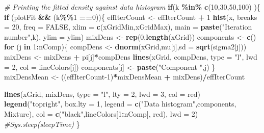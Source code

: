 \documentclass[]{article}
\newenvironment{Shaded}{\begin{snugshade}}{\end{snugshade}}
\newcommand{\CommentTok}[1]{\textcolor[rgb]{0.56,0.35,0.01}{\textit{#1}}}
\newcommand{\ControlFlowTok}[1]{\textcolor[rgb]{0.13,0.29,0.53}{\textbf{#1}}}
\newcommand{\DataTypeTok}[1]{\textcolor[rgb]{0.13,0.29,0.53}{#1}}
\newcommand{\DecValTok}[1]{\textcolor[rgb]{0.00,0.00,0.81}{#1}}
\newcommand{\KeywordTok}[1]{\textcolor[rgb]{0.13,0.29,0.53}{\textbf{#1}}}
\newcommand{\NormalTok}[1]{#1}
\newcommand{\OperatorTok}[1]{\textcolor[rgb]{0.81,0.36,0.00}{\textbf{#1}}}
\newcommand{\OtherTok}[1]{\textcolor[rgb]{0.56,0.35,0.01}{#1}}
\newcommand{\StringTok}[1]{\textcolor[rgb]{0.31,0.60,0.02}{#1}}
\begin{document}
\begin{Shaded}
\begin{Highlighting}[]
  
  \CommentTok{\# Printing the fitted density against data histogram}
  \ControlFlowTok{if}\NormalTok{(k }\OperatorTok{\%in\%}\StringTok{ }\KeywordTok{c}\NormalTok{(}\DecValTok{10}\NormalTok{,}\DecValTok{30}\NormalTok{,}\DecValTok{50}\NormalTok{,}\DecValTok{100}\NormalTok{) )\{}
  \ControlFlowTok{if}\NormalTok{ (plotFit }\OperatorTok{\&\&}\StringTok{ }\NormalTok{(k}\OperatorTok{\%\%}\DecValTok{1} \OperatorTok{==}\DecValTok{0}\NormalTok{))\{}
\NormalTok{    effIterCount \textless{}{-}}\StringTok{ }\NormalTok{effIterCount }\OperatorTok{+}\StringTok{ }\DecValTok{1}
    \KeywordTok{hist}\NormalTok{(x, }\DataTypeTok{breaks =} \DecValTok{20}\NormalTok{, }\DataTypeTok{freq =} \OtherTok{FALSE}\NormalTok{, }\DataTypeTok{xlim =} \KeywordTok{c}\NormalTok{(xGridMin,xGridMax), }\DataTypeTok{main =} \KeywordTok{paste}\NormalTok{(}\StringTok{"Iteration number"}\NormalTok{,k), }\DataTypeTok{ylim =}\NormalTok{ ylim)}
\NormalTok{    mixDens \textless{}{-}}\StringTok{ }\KeywordTok{rep}\NormalTok{(}\DecValTok{0}\NormalTok{,}\KeywordTok{length}\NormalTok{(xGrid))}
\NormalTok{    components \textless{}{-}}\StringTok{ }\KeywordTok{c}\NormalTok{()}
    \ControlFlowTok{for}\NormalTok{ (j }\ControlFlowTok{in} \DecValTok{1}\OperatorTok{:}\NormalTok{nComp)\{}
\NormalTok{      compDens \textless{}{-}}\StringTok{ }\KeywordTok{dnorm}\NormalTok{(xGrid,mu[j],}\DataTypeTok{sd =} \KeywordTok{sqrt}\NormalTok{(sigma2[j]))}
\NormalTok{      mixDens \textless{}{-}}\StringTok{ }\NormalTok{mixDens }\OperatorTok{+}\StringTok{ }\NormalTok{pi[j]}\OperatorTok{*}\NormalTok{compDens}
      \KeywordTok{lines}\NormalTok{(xGrid, compDens, }\DataTypeTok{type =} \StringTok{"l"}\NormalTok{, }\DataTypeTok{lwd =} \DecValTok{2}\NormalTok{, }\DataTypeTok{col =}\NormalTok{ lineColors[j])}
\NormalTok{      components[j] \textless{}{-}}\StringTok{ }\KeywordTok{paste}\NormalTok{(}\StringTok{"Component "}\NormalTok{,j)}
\NormalTok{    \}}
\NormalTok{    mixDensMean \textless{}{-}}\StringTok{ }\NormalTok{((effIterCount}\DecValTok{{-}1}\NormalTok{)}\OperatorTok{*}\NormalTok{mixDensMean }\OperatorTok{+}\StringTok{ }\NormalTok{mixDens)}\OperatorTok{/}\NormalTok{effIterCount}
    
    \KeywordTok{lines}\NormalTok{(xGrid, mixDens, }\DataTypeTok{type =} \StringTok{"l"}\NormalTok{, }\DataTypeTok{lty =} \DecValTok{2}\NormalTok{, }\DataTypeTok{lwd =} \DecValTok{3}\NormalTok{, }\DataTypeTok{col =} \StringTok{\textquotesingle{}red\textquotesingle{}}\NormalTok{)}
    \KeywordTok{legend}\NormalTok{(}\StringTok{"topright"}\NormalTok{, }\DataTypeTok{box.lty =} \DecValTok{1}\NormalTok{, }\DataTypeTok{legend =} \KeywordTok{c}\NormalTok{(}\StringTok{"Data histogram"}\NormalTok{,components, }\StringTok{\textquotesingle{}Mixture\textquotesingle{}}\NormalTok{), }\DataTypeTok{col =} \KeywordTok{c}\NormalTok{(}\StringTok{"black"}\NormalTok{,lineColors[}\DecValTok{1}\OperatorTok{:}\NormalTok{nComp], }\StringTok{\textquotesingle{}red\textquotesingle{}}\NormalTok{), }\DataTypeTok{lwd =} \DecValTok{2}\NormalTok{)}
    \CommentTok{\#Sys.sleep(sleepTime)}
\NormalTok{  \}}
  

\end{Highlighting}
\end{Shaded}
\end{document}
